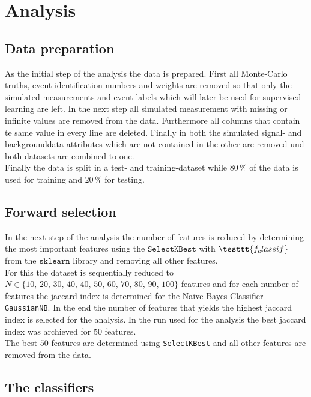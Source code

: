 \section{Analysis}\label{sec:Analysis}

\subsection{Data preparation}

As the initial step of the analysis the data is prepared. 
First all Monte-Carlo truths, event identification numbers and weights are removed so that only the simulated measurements and 
event-labels which will later be used for supervised learning are left. In the next step all simulated measurement with missing or 
infinite values are removed from the data. Furthermore all columns that contain te same value in every line are deleted. 
Finally in both the simulated signal- and backgrounddata attributes which are not contained in the other are removed und 
both datasets are combined to one. \\
Finally the data is split in a test- and training-dataset while $80 \, \%$ of the data is used for training and $20 \,\%$ 
for testing. 

\subsection{Forward selection}

In the next step of the analysis the number of features is reduced by determining the most important features using 
the $\texttt{SelectKBest}$ with $\testtt{f_classif}$ from the $\texttt{sklearn}$ library and removing all other features. \\
For this the dataset is sequentially reduced to $N \in \{ 10, \, 20, \, 30, \, 40, \, 40, \, 50, \, 60, \, 70, \, 80, \, 90, \, 100 \}$ 
features and for each number of features the jaccard index is determined for the Naive-Bayes Classifier \texttt{GaussianNB}. 
In the end the number of features that yields the highest jaccard index is selected for the analysis. 
In the run used for the analysis the best jaccard index was archieved for $50$ features. \\
The best $50$ features are determined using \texttt{SelectKBest} and all other features are removed from the data. 

\subsection{The classifiers}

